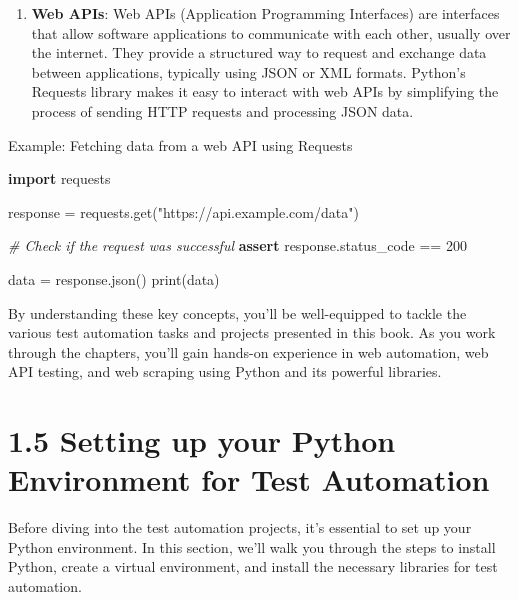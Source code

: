 \documentclass[
  paper=a4,
  ,captions=tableheading
]{scrartcl}
\newenvironment{Shaded}{}{}
\newcommand{\BuiltInTok}[1]{\textcolor[rgb]{0.00,0.50,0.00}{#1}}
\newcommand{\CommentTok}[1]{\textcolor[rgb]{0.38,0.63,0.69}{\textit{#1}}}
\newcommand{\ControlFlowTok}[1]{\textcolor[rgb]{0.00,0.44,0.13}{\textbf{#1}}}
\newcommand{\DecValTok}[1]{\textcolor[rgb]{0.25,0.63,0.44}{#1}}
\newcommand{\ImportTok}[1]{\textcolor[rgb]{0.00,0.50,0.00}{\textbf{#1}}}
\newcommand{\NormalTok}[1]{#1}
\newcommand{\OperatorTok}[1]{\textcolor[rgb]{0.40,0.40,0.40}{#1}}
\newcommand{\StringTok}[1]{\textcolor[rgb]{0.25,0.44,0.63}{#1}}
\providecommand{\tightlist}{%
  \setlength{\itemsep}{0pt}\setlength{\parskip}{0pt}}
\begin{document}
\begin{enumerate}
\def\labelenumi{\arabic{enumi}.}
\tightlist
\item
  \textbf{Web APIs}: Web APIs (Application Programming Interfaces) are
  interfaces that allow software applications to communicate with each
  other, usually over the internet. They provide a structured way to
  request and exchange data between applications, typically using JSON
  or XML formats. Python's Requests library makes it easy to interact
  with web APIs by simplifying the process of sending HTTP requests and
  processing JSON data.
\end{enumerate}

Example: Fetching data from a web API using Requests

\begin{Shaded}
\begin{Highlighting}[]
\ImportTok{import}\NormalTok{ requests}

\NormalTok{response }\OperatorTok{=}\NormalTok{ requests.get(}\StringTok{"https://api.example.com/data"}\NormalTok{)}

\CommentTok{\# Check if the request was successful}
\ControlFlowTok{assert}\NormalTok{ response.status\_code }\OperatorTok{==} \DecValTok{200}

\NormalTok{data }\OperatorTok{=}\NormalTok{ response.json()}
\BuiltInTok{print}\NormalTok{(data)}
\end{Highlighting}
\end{Shaded}

By understanding these key concepts, you'll be well-equipped to tackle
the various test automation tasks and projects presented in this book.
As you work through the chapters, you'll gain hands-on experience in web
automation, web API testing, and web scraping using Python and its
powerful libraries.

\hypertarget{setting-up-your-python-environment-for-test-automation}{%
\section{1.5 Setting up your Python Environment for Test
Automation}\label{setting-up-your-python-environment-for-test-automation}}

Before diving into the test automation projects, it's essential to set
up your Python environment. In this section, we'll walk you through the
steps to install Python, create a virtual environment, and install the
necessary libraries for test automation.
\end{document}
